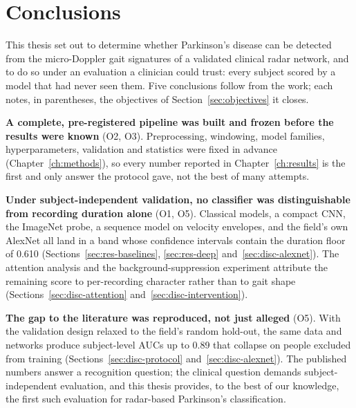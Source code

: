 
\section{Conclusions}
\label{sec:conclusions}

This thesis set out to determine whether Parkinson's disease can be detected
from the micro-Doppler gait signatures of a validated clinical radar
network, and to do so under an evaluation a clinician could trust: every
subject scored by a model that had never seen them. Five conclusions follow
from the work; each notes, in parentheses, the objectives of
Section~\ref{sec:objectives} it closes.

\textbf{A complete, pre-registered pipeline was built and frozen before the
results were known} (O2, O3). Preprocessing, windowing, model families,
hyperparameters, validation and statistics were fixed in advance
(Chapter~\ref{ch:methods}), so every number reported in Chapter~\ref{ch:results} is the first and only
answer the protocol gave, not the best of many attempts.

\textbf{Under subject-independent validation, no classifier was
distinguishable from recording duration alone} (O1, O5). Classical models, a compact
CNN, the ImageNet probe, a sequence model on velocity envelopes, and
the field's own AlexNet all land in a band whose confidence intervals
contain the duration floor of 0.610 (Sections~\ref{sec:res-baselines},
\ref{sec:res-deep} and~\ref{sec:disc-alexnet}). The attention analysis and the
background-suppression experiment attribute the remaining score to
per-recording character rather than to gait shape
(Sections~\ref{sec:disc-attention} and~\ref{sec:disc-intervention}).

\textbf{The gap to the literature was reproduced, not just alleged} (O5).
With the validation design relaxed to the field's random hold-out, the same data
and networks produce subject-level AUCs up to 0.89 that collapse on people
excluded from training (Sections~\ref{sec:disc-protocol}
and~\ref{sec:disc-alexnet}). The published
numbers answer a recognition question; the clinical question demands
subject-independent evaluation, and this thesis provides, to the best of our
knowledge, the first such evaluation for radar-based Parkinson's
classification.

